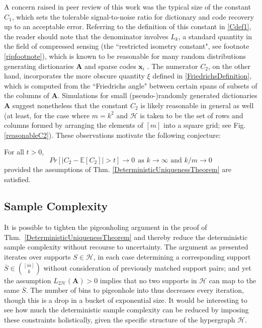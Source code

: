 A concern raised in peer review of this work was the typical size of the constant $C_1$, which sets the tolerable signal-to-noise ratio for dictionary and code recovery up to an acceptable error. Referring to the definition of this constant in \eqref{Cdef1}, the reader should note that the denominator involves $L_k$, a standard quantity in the field of compressed sensing (the ``restricted isometry constant", see footnote \ref{ripfootnote}), which is known to be reasonable for many random distributions generating dictionaries $\mathbf{A}$ and sparse codes $\mathbf{x}_i$ \cite{baraniuk2008simple}. The numerator $C_2$, on the other hand, incorporates the more obscure quantity $\xi$ defined in \eqref{FriedrichsDefinition}, which is computed from the ``Friedrichs angle" between certain spans of subsets of the columns of $\mathbf{A}$. Simulations for small (pseudo-)randomly generated dictionaries $\mathbf{A}$ suggest nonetheless that the constant $C_2$ is likely reasonable in general as well (at least, for the case where $m=k^2$ and $\mathcal{H}$ is taken to be the set of rows and columns formed by arranging the elements of $[m]$ into a square grid; see Fig. \ref{reasonableC2}). These observations motivate the following conjecture:

\begin{conjecture}
For all $t > 0$,
\begin{equation*}
Pr[ \left| C_2- \mathbb{E}[C_2 ] \right| > t] \to 0 \ \ \text{as $k \to \infty$ and $k/m \to 0$} 
\end{equation*}
provided the assumptions of Thm. \ref{DeterministicUniquenessTheorem} are satisfied.
\end{conjecture}

\subsection{Sample Complexity}

It is possible to tighten the pigeonholing argument in the proof of Thm.~\ref{DeterministicUniquenessTheorem} and thereby reduce the deterministic sample complexity without recourse to uncertainty. The argument as presented iterates over supports $S \in \mathcal{H}$, in each case determining a corresponding support $\overline S \in {[\overline m] \choose k}$ without consideration of previously matched support pairs; and yet the assumption $L_{2\mathcal{H}}(\mathbf{A}) > 0$ implies that no two supports in $\mathcal{H}$ can map to the same $\overline S$. The number of bins to pigeonhole into thus decreases every iteration, though this is a drop in a bucket of exponential size. It would be interesting to see how much the deterministic sample complexity can be reduced by imposing these constraints holistically, given the specific structure of the hypergraph $\mathcal{H}$.

